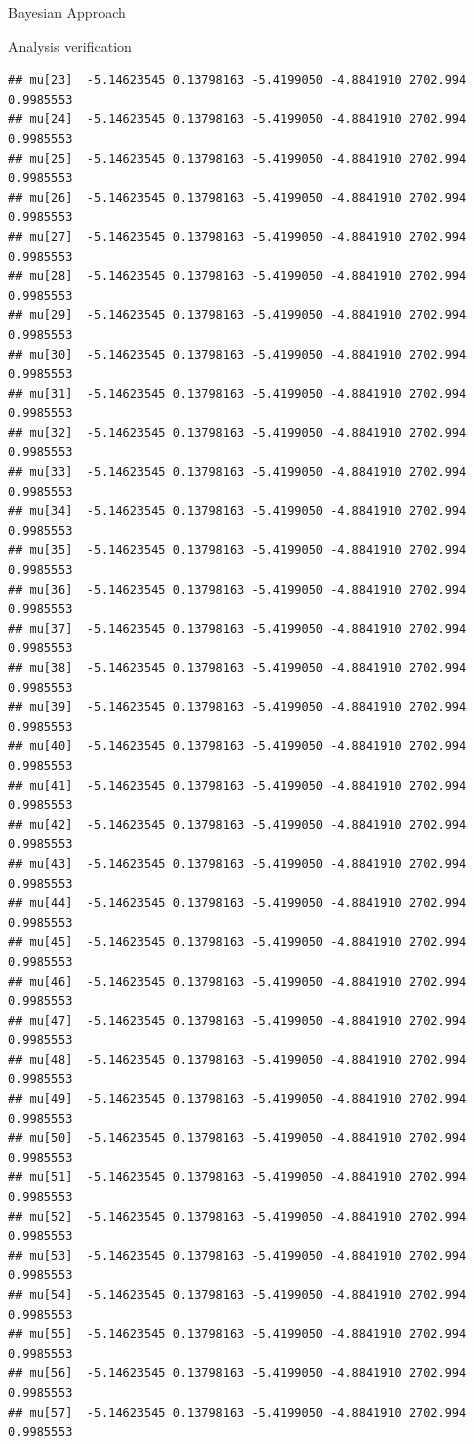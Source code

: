 \documentclass[
  ignorenonframetext,
]{beamer}
\begin{document}
\begin{frame}[fragile]{Bayesian Approach}
\begin{block}{Analysis verification}
\begin{verbatim}
## mu[23]  -5.14623545 0.13798163 -5.4199050 -4.8841910 2702.994 0.9985553
## mu[24]  -5.14623545 0.13798163 -5.4199050 -4.8841910 2702.994 0.9985553
## mu[25]  -5.14623545 0.13798163 -5.4199050 -4.8841910 2702.994 0.9985553
## mu[26]  -5.14623545 0.13798163 -5.4199050 -4.8841910 2702.994 0.9985553
## mu[27]  -5.14623545 0.13798163 -5.4199050 -4.8841910 2702.994 0.9985553
## mu[28]  -5.14623545 0.13798163 -5.4199050 -4.8841910 2702.994 0.9985553
## mu[29]  -5.14623545 0.13798163 -5.4199050 -4.8841910 2702.994 0.9985553
## mu[30]  -5.14623545 0.13798163 -5.4199050 -4.8841910 2702.994 0.9985553
## mu[31]  -5.14623545 0.13798163 -5.4199050 -4.8841910 2702.994 0.9985553
## mu[32]  -5.14623545 0.13798163 -5.4199050 -4.8841910 2702.994 0.9985553
## mu[33]  -5.14623545 0.13798163 -5.4199050 -4.8841910 2702.994 0.9985553
## mu[34]  -5.14623545 0.13798163 -5.4199050 -4.8841910 2702.994 0.9985553
## mu[35]  -5.14623545 0.13798163 -5.4199050 -4.8841910 2702.994 0.9985553
## mu[36]  -5.14623545 0.13798163 -5.4199050 -4.8841910 2702.994 0.9985553
## mu[37]  -5.14623545 0.13798163 -5.4199050 -4.8841910 2702.994 0.9985553
## mu[38]  -5.14623545 0.13798163 -5.4199050 -4.8841910 2702.994 0.9985553
## mu[39]  -5.14623545 0.13798163 -5.4199050 -4.8841910 2702.994 0.9985553
## mu[40]  -5.14623545 0.13798163 -5.4199050 -4.8841910 2702.994 0.9985553
## mu[41]  -5.14623545 0.13798163 -5.4199050 -4.8841910 2702.994 0.9985553
## mu[42]  -5.14623545 0.13798163 -5.4199050 -4.8841910 2702.994 0.9985553
## mu[43]  -5.14623545 0.13798163 -5.4199050 -4.8841910 2702.994 0.9985553
## mu[44]  -5.14623545 0.13798163 -5.4199050 -4.8841910 2702.994 0.9985553
## mu[45]  -5.14623545 0.13798163 -5.4199050 -4.8841910 2702.994 0.9985553
## mu[46]  -5.14623545 0.13798163 -5.4199050 -4.8841910 2702.994 0.9985553
## mu[47]  -5.14623545 0.13798163 -5.4199050 -4.8841910 2702.994 0.9985553
## mu[48]  -5.14623545 0.13798163 -5.4199050 -4.8841910 2702.994 0.9985553
## mu[49]  -5.14623545 0.13798163 -5.4199050 -4.8841910 2702.994 0.9985553
## mu[50]  -5.14623545 0.13798163 -5.4199050 -4.8841910 2702.994 0.9985553
## mu[51]  -5.14623545 0.13798163 -5.4199050 -4.8841910 2702.994 0.9985553
## mu[52]  -5.14623545 0.13798163 -5.4199050 -4.8841910 2702.994 0.9985553
## mu[53]  -5.14623545 0.13798163 -5.4199050 -4.8841910 2702.994 0.9985553
## mu[54]  -5.14623545 0.13798163 -5.4199050 -4.8841910 2702.994 0.9985553
## mu[55]  -5.14623545 0.13798163 -5.4199050 -4.8841910 2702.994 0.9985553
## mu[56]  -5.14623545 0.13798163 -5.4199050 -4.8841910 2702.994 0.9985553
## mu[57]  -5.14623545 0.13798163 -5.4199050 -4.8841910 2702.994 0.9985553

\end{verbatim}
\end{block}
\end{frame}
\end{document}
